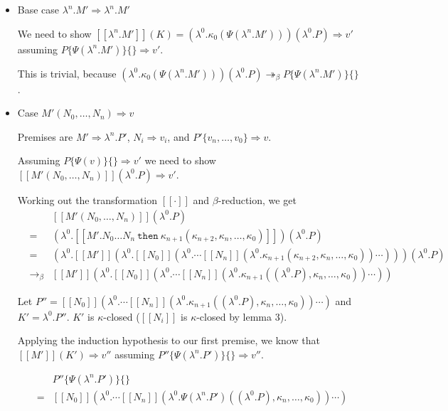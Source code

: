 \documentclass[a4paper,11pt]{article}
\begin{document}
\begin{itemize}
\item{Base case $\lambda^{n}.M' \Rightarrow \lambda^{n}.M'$}

  We need to show $[\![\lambda^{n}.M']\!](K) =
  (\lambda^{0}.\kappa_{0}(\Psi(\lambda^{n}.M'))) (\lambda^{0}.P)
  \Rightarrow v'$ assuming $P\{\Psi(\lambda^{n}.M')\}\{\} \Rightarrow
  v'$.

  This is trivial, because
  $(\lambda^{0}.\kappa_{0}(\Psi(\lambda^{n}.M'))) (\lambda^{0}.P)
  \twoheadrightarrow_{\beta} P\{\Psi(\lambda^{n}.M')\}\{\}$.

\item{Case $M'(N_{0}, \ldots, N_{n}) \Rightarrow v$}

Premises are $M' \Rightarrow \lambda^{n}.P'$, $N_{i} \Rightarrow
v_{i}$, and $P'\{v_{n}, \ldots, v_{0}\} \Rightarrow v$.

Assuming $P\{\Psi(v)\}\{\} \Rightarrow v'$ we need to show
$[\![M'(N_{0}, \ldots, N_{n})]\!](\lambda^{0}.P) \Rightarrow v'$.

Working out the transformation $[\![\cdot]\!]$ and $\beta$-reduction,
we get
\begin{eqnarray*}
&   & [\![M'(N_{0}, \ldots, N_{n})]\!] (\lambda^{0}.P) \\
& = & (\lambda^{0}.[\![M'.N_{0} \ldots N_{n} \: \texttt{then} \: \kappa_{n+1}(\kappa_{n+2}, \kappa_{n}, \ldots, \kappa_{0})]\!]) (\lambda^{0}.P) \\
& = & (\lambda^{0}.[\![M']\!](\lambda^{0}.[\![N_{0}]\!](\lambda^{0}. \cdots [\![N_{n}]\!](\lambda^{0}.\kappa_{n+1}(\kappa_{n+2}, \kappa_{n}, \ldots, \kappa_{0})) \cdots ))) (\lambda^{0}.P) \\
& \rightarrow_{\beta} & [\![M']\!](\lambda^{0}.[\![N_{0}]\!](\lambda^{0}. \cdots [\![N_{n}]\!](\lambda^{0}.\kappa_{n+1}((\lambda^{0}.P), \kappa_{n}, \ldots, \kappa_{0})) \cdots ))
\end{eqnarray*}

Let $P'' = [\![N_{0}]\!](\lambda^{0}. \cdots [\![N_{n}]\!](\lambda^{0}.\kappa_{n+1}((\lambda^{0}.P), \kappa_{n}, \ldots, \kappa_{0})) \cdots )$ and $K' = \lambda^{0}.P''$. $K'$ is $\kappa$-closed ($[\![N_{i}]\!]$ is $\kappa$-closed by lemma 3).

Applying the induction hypothesis to our first premise, we know that $[\![M']\!](K') \Rightarrow v''$ assuming $P''\{\Psi(\lambda^{n}.P')\}\{\} \Rightarrow v''$.

\begin{eqnarray*}
&   & P''\{\Psi(\lambda^{n}.P')\}\{\} \\
& = & [\![N_{0}]\!](\lambda^{0}. \cdots [\![N_{n}]\!](\lambda^{0}.\Psi(\lambda^{n}.P')((\lambda^{0}.P), \kappa_{n}, \ldots, \kappa_{0})) \cdots )
\end{eqnarray*}


\end{itemize}
\end{document}
